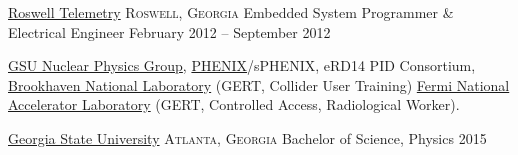 \documentclass[10pt,letterpaper]{article}
\begin{document}
\headedsection
  {\href{http://web.archive.org/web/20111024221117/http://www.roswelltelemetry.com/}{Roswell Telemetry}}
  {\textsc{Roswell, Georgia}} {%
  \headedsubsection
    {Embedded System Programmer \& Electrical Engineer}
    {February 2012 -- September 2012}
    {}
}

\spacedhrule{0.2em}{-0.4em}

  {\href{http://phynp6.phy-astr.gsu.edu/}{GSU Nuclear Physics Group},
  \href{https://www.phenix.bnl.gov/}{PHENIX}/sPHENIX,
  eRD14 PID Consortium,
  \href{https://www.bnl.gov/}{Brookhaven National Laboratory} (GERT, Collider User Training)
  \href{http://www.fnal.gov/}{Fermi National Accelerator Laboratory} (GERT, Controlled Access, Radiological Worker).
  }

  \spacedhrule{0.2em}{-0.4em}

\headedsection
  {\href{http://www.gsu.edu}{Georgia State University}}
  {\textsc{Atlanta, Georgia}} {%
  \headedsubsection
    {Bachelor of Science, Physics}
    {2015}
    {}
}

\spacedhrule{0.5em}{-0.4em}

\end{document}
